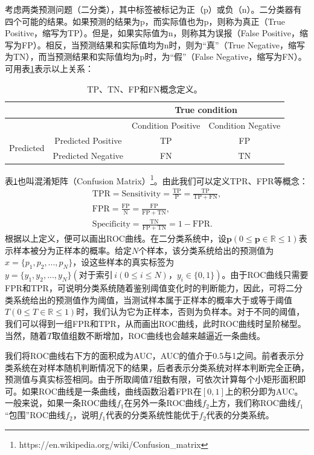 考虑两类预测问题（二分类），其中标签被标记为正（p）或负（n）。二分类器有四个可能的结果。如果预测的结果为p，而实际值也为p，则称为真正（True Positive，缩写为TP）。但是，如果实际值为n，则称其为误报（False Positive，缩写为FP）。相反，当预测结果和实际值均为n时，则为“真”（True Negative，缩写为TN），而当预测结果和实际值均为p时，为“假”（False Negative，缩写为FN）。可用表\ref{tab:confusion_mateix}表示以上关系：
\begin{table}[h]
	\centering
	\caption{TP、TN、FP和FN概念定义。}
	\label{tab:confusion_mateix}
	\begin{tabular}{c|c|c|c|}
		\toprule[2pt]
		&                    & \multicolumn{2}{c|}{True condition}     \\ \hline
		&                    & Condition Positive & Condition Negative \\ \hline
		\multirow{2}{*}{Predicted} & Predicted Positive & TP  & FP \\ \cline{2-4} 
		& Predicted Negative & FN & TN  \\ 
		\bottomrule[2pt]
	\end{tabular}
\end{table}

\noindent 表\ref{tab:confusion_mateix}也叫混淆矩阵（Confusion Matrix）\footnote{https://en.wikipedia.org/wiki/Confusion\_matrix}。由此我们可以定义TPR、FPR等概念：
\begin{gather}
	\mathrm{TPR}=\mathrm{Sensitivity}=\frac{\mathrm{TP}}{\mathrm{P}}=\frac{\mathrm{TP}}{\mathrm{TP}+\mathrm{FN}},\\
	\mathrm{FPR}=\frac{\mathrm{FP}}{\mathrm{N}}=\frac{\mathrm{FP}}{\mathrm{FP}+\mathrm{TN}},\\
	\mathrm{Specificity}=\frac{\mathrm{TN}}{\mathrm{FP}+\mathrm{TN}}=1-\mathrm{FPR}.
\end{gather}
根据以上定义，便可以画出ROC曲线。在二分类系统中，设$\boldsymbol{p}(0\leq \boldsymbol{p}\in \mathbb{R} \leq 1)$表示样本被分为正样本的概率。给定$N$个样本，该分类系统给出的预测值为$x=\{p_1,p_2,...,p_N
\}$，设这些样本的真实标签为$y=\{y_1,y_2,...,y_N\}(\text{对于索引}\, i(0\leq i \le N)\text{，}y_i\in \{0,1\})$。由于ROC曲线只需要FPR和TPR，可说明分类系统随着鉴别阈值变化时的判断能力，因此，可将二分类系统给出的预测值作为阈值，当测试样本属于正样本的概率大于或等于阈值$T(0\leq T\in \mathbb{R} \leq 1)$时，我们认为它为正样本，否则为负样本。对于不同的阈值，我们可以得到一组FPR和TPR，从而画出ROC曲线，此时ROC曲线时呈阶梯型。当然，随着$T$取值组数不断增加，ROC曲线也会越来越逼近一条曲线。

我们将ROC曲线右下方的面积成为AUC，AUC的值介于0.5与1之间。前者表示分类系统在对样本随机判断情况下的结果，后者表示分类系统对样本判断完全正确，预测值与真实标签相同。由于所取阈值$T$组数有限，可依次计算每个小矩形面积即可。如果ROC曲线是一条曲线，曲线函数沿着FPR在$[0,1]$上的积分即为AUC。一般来说，如果一条ROC曲线$f_1$在另外一条ROC曲线$f_2$上方，我们称ROC曲线$f_1$“包围”ROC曲线$f_2$，说明$f_1$代表的分类系统性能优于$f_2$代表的分类系统。
